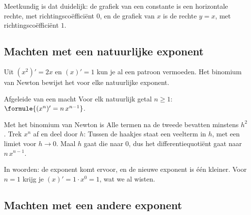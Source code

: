 Meetkundig is dat duidelijk: de grafiek van een constante is een horizontale rechte, met richtingscoëfficiënt $0$, en de grafiek van $x$ is de rechte $y = x$, met richtingscoëfficiënt $1$.

\subsection{Machten met een natuurlijke exponent}

Uit $(x^2)' = 2x$ en $(x)' = 1$ kun je al een patroon vermoeden. Het binomium van Newton bewijst het voor elke natuurlijke exponent.

\begin{theorie}
\begin{stelling}{Afgeleide van een macht}
Voor elk natuurlijk getal $n \geqslant 1$: \quad $\formule{(x^n)' = n\,x^{n - 1}}$.
\end{stelling}
\begin{bewijs}
Met het binomium van Newton is
Alle termen na de tweede bevatten minstens $h^2$. Trek $x^n$ af en deel door $h$:
Tussen de haakjes staat een veelterm in $h$, met een limiet voor $h \to 0$. Maal $h$ gaat die naar $0$, dus het differentiequotiënt gaat naar $n\,x^{n-1}$.
\end{bewijs}
\end{theorie}

In woorden: de exponent komt ervoor, en de nieuwe exponent is één kleiner. Voor $n = 1$ krijg je $(x)' = 1 \cdot x^0 = 1$, wat we al wisten.


\begin{oefeningen}
\end{oefeningen}

\subsection{Machten met een andere exponent}

